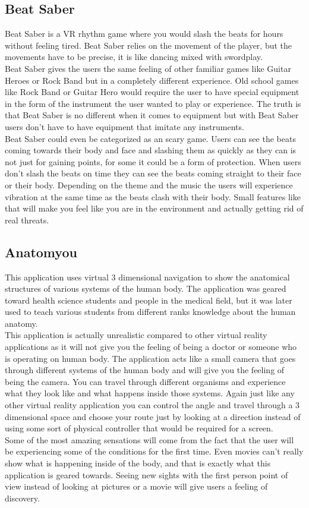 \documentclass{article}
\begin{document}
\subsection*{Beat Saber}
Beat Saber is a VR rhythm game where you would slash the beats for hours without feeling tired. Beat Saber relies on the movement of the player, but the movements have to be precise, it is like dancing mixed with swordplay. \\
Beat Saber gives the users the same feeling of other familiar games like Guitar Heroes or Rock Band but in a completely different experience. Old school games like Rock Band or Guitar Hero would require the user to have special equipment in the form of the instrument the user wanted to play or experience. The truth is that Beat Saber is no different when it comes to equipment but with Beat Saber users don't have to have equipment that imitate any instruments. \\
Beat Saber could even be categorized as an scary game. Users can see the beats coming towards their body and face and slashing them as quickly as they can is not just for gaining points, for some it could be a form of protection. When users don't slash the beats on time they can see the beats coming straight to their face or their body. Depending on the theme and the music the users will  experience vibration at the same time as the beats clash with their body. Small features like that will make you feel like you are in the environment and actually getting rid of real threats. 



\subsection*{Anatomyou}
This application uses virtual 3 dimensional navigation to show the anatomical structures of various systems of the human body. The application was geared toward health science students and people in the medical field, but it was later used to teach various students from different ranks knowledge about the human anatomy.\\
This application is actually unrealistic compared to other virtual reality applications as it will not give you the feeling of being a doctor or someone who is operating on human body. The application acts like a small camera that goes through different systems of the human body and will give you the feeling of being the camera. You can travel through different organisms and experience what they look like and what happens inside those systems. Again just like any other virtual reality application you can control the angle and travel through a 3 dimensional space and choose your route just by looking at a direction instead of using some sort of physical controller that would be required for a screen. \\
Some of the most amazing sensations will come from the fact that the user will be experiencing some of the conditions for the first time. Even movies can't really show what is happening inside of the body, and that is exactly what this application is geared towards. Seeing new sights with the first person point of view instead of looking at pictures or a movie will give users a feeling of discovery.
\end{document}
